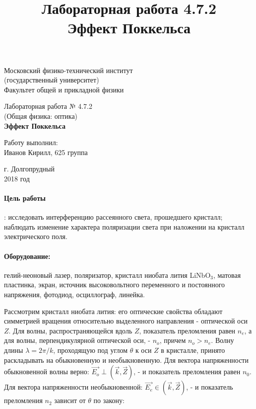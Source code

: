 \documentclass[12pt]{kiarticle}
\title{Лабораторная работа 4.7.2 \\ Эффект Поккельса}
\begin{document}
	
		\begin{titlepage}
		\begin{center}
			\large 	Московский физико-технический институт \\
			(государственный университет) \\
			Факультет общей и прикладной физики \\
			\vspace{0.2cm}
			
			\vspace{4.5cm}
			Лабораторная работа № 4.7.2 \\ \vspace{0.2cm}
			\large (Общая физика: оптика) \\ \vspace{0.2cm}
			\LARGE \textbf{Эффект Поккельса}
		\end{center}
		\vspace{2.3cm} \large
		
		\begin{center}
			Работу выполнил: \\
			Иванов Кирилл,
			625 группа
			\vspace{10mm}		
			
		\end{center}
		
		\begin{center} \vspace{60mm}
			г. Долгопрудный \\
			2018 год
		\end{center}
	\end{titlepage}
	
	
		\paragraph*{Цель работы}: исследовать интерференцию рассеянного света, прошедшего кристалл; наблюдать изменение характера поляризации света при наложении на кристалл электрического поля.
	
		\paragraph*{Оборудование:} гелий-неоновый лазер, поляризатор, кристалл ниобата лития LiNbO$_3$, матовая пластинка, экран, источник высоковольтного переменного и постоянного напряжения, фотодиод, осциллограф, линейка.
	
	Рассмотрим кристалл ниобата лития: его оптические свойства обладают симметрией вращения относительно выделенного направления - оптической оси $Z$. Для волны, распространяющейся вдоль $Z$, показатель преломления равен $n_e$, а для волны, перпендикулярной оптической оси, - $n_o$, причем $n_o > n_e$. Волну длины $\lambda = 2\pi/k$, проходящую под углом $\theta$ к оси $Z$ в кристалле, принято раскладывать на обыкновенную и необыкновенную. Для вектора напряженности обыкновенной волны верно: $\overrightarrow{E_o} \perp (\overrightarrow{k}, \overrightarrow{Z})$, - и показатель преломления равен $n_0$. Для вектора напряженности необыкновенной: $\overrightarrow{E_e} \in (\overrightarrow{k}, \overrightarrow{Z})$, - и показатель преломления $n_2$ зависит от $\theta$ по закону:
	
\end{document}
